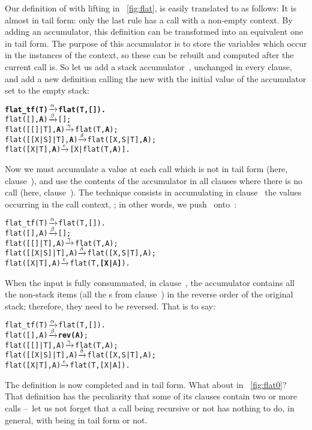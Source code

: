 Our definition of  with lifting in \fig~\vref{fig:flat},
is easily translated to \Erlang as follows: 
It is almost in tail form: only the last rule has a call with a
non\hyp{}empty context. By adding an accumulator, this definition can
be transformed into an equivalent one in tail form. The purpose of
this accumulator is to store the variables which occur in the
instances of the context, so these can be rebuilt and computed after
the current call is. So let us add a stack accumulator~,
unchanged in every clause, and add a new 
definition calling the new  with the initial value of
the accumulator set to the empty stack:
\begin{alltt}
\textbf{flat\_tf(T)        \(\xrightarrow{\smash{\alpha}}\) flat(T,[]).}
flat(       [],\textbf{A}) \(\xrightarrow{\smash{\beta}}\) [];\hfill% A \emph{unused yet}
flat(   [[]|T],\textbf{A}) \(\xrightarrow{\smash{\gamma}}\) flat(T,\textbf{A});
flat([[X|S]|T],\textbf{A}) \(\xrightarrow{\smash{\delta}}\) flat([X,S|T],\textbf{A});
flat(    [X|T],\textbf{A}) \(\xrightarrow{\smash{\epsilon}}\) [X|flat(T,\textbf{A})].
\end{alltt}
Now we must accumulate a value at each call which is not in tail form
(here, clause~\clause{\epsilon}), and use the contents of the
accumulator in all clauses where there is no call (here,
clause~\clause{\alpha}). The technique consists in accumulating in
clause~\clause{\epsilon} the values occurring in the call context,
\erlcode{[X|\textvisiblespace]}; in other words, we
push~ onto~:
\begin{alltt}
flat\_tf(T)        \(\smashedrightarrow{\alpha}\) flat(T,[]).
flat(       [],A) \(\smashedrightarrow{\beta}\) [];
flat(   [[]|T],A) \(\smashedrightarrow{\gamma}\) flat(T,A);
flat([[X|S]|T],A) \(\smashedrightarrow{\delta}\) flat([X,S|T],A);
flat(    [X|T],A) \(\smashedrightarrow{\epsilon}\) flat(T,\textbf{[X|}A\textbf{]}).\hfill% \emph{Here}
\end{alltt}
When the input is fully consummated, in clause~\clause{\beta}, the
accumulator contains all the non\hyp{}stack items (all the
s from clause~\clause{\epsilon}) in the reverse order of the
original stack; therefore, they need to be reversed. That is to say:
\begin{alltt}
flat\_tf(T)        \(\smashedrightarrow{\alpha}\) flat(T,[]).
flat(       [],A) \(\smashedrightarrow{\beta}\) \textbf{rev(A)};
flat(   [[]|T],A) \(\smashedrightarrow{\gamma}\) flat(T,A);
flat([[X|S]|T],A) \(\smashedrightarrow{\delta}\) flat([X,S|T],A);
flat(    [X|T],A) \(\smashedrightarrow{\epsilon}\) flat(T,[X|A]).
\end{alltt}
The definition is now completed and in tail form. What about
 in \fig~\vref{fig:flat0}?  
That definition has the peculiarity that some of its clauses contain
two or more calls --~let us not forget that a call being recursive or
not has nothing to do, in general, with being in tail form or not.

